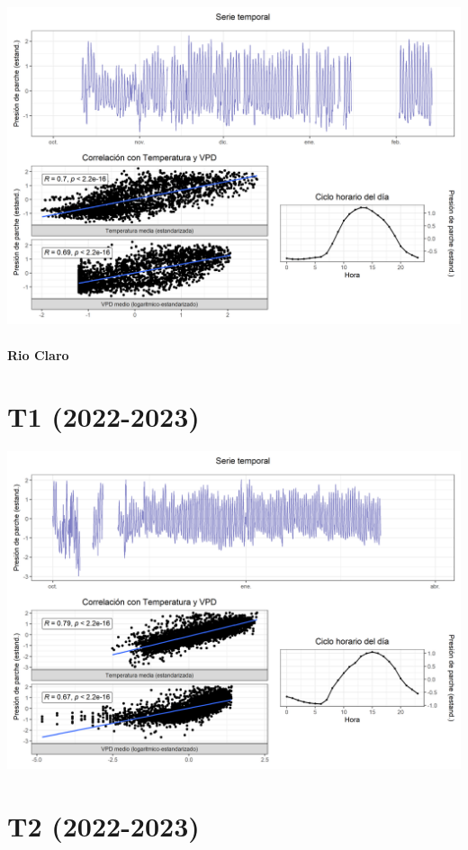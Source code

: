\documentclass[
  letterpaper,
  DIV=11,
  numbers=noendperiod]{scrreprt}
\begin{document}
\includegraphics{figuras/05_turgor_tratamiento/2023_2024_La_Esperanza_T4.png}

\subsubsection{Rio Claro}\label{rio-claro-5}

\chapter{T1 (2022-2023)}

\includegraphics{figuras/05_turgor_tratamiento/2022_2023_Rio_Claro_T1.png}

\chapter{T2 (2022-2023)}
\end{document}
